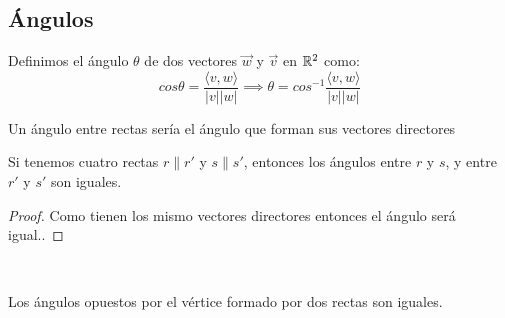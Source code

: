 \subsection{Ángulos}

\begin{ndef}
  Definimos el ángulo $\theta$ de dos vectores $\vec{w}$ y $\vec{v}$ en $\mathbb{R}^2$ como:
  \[
    cos \theta =  \frac{\langle  v,w \rangle }{|v||w|} \implies \theta = cos^{-1} \frac{\langle  v,w \rangle }{|v||w|}
  \]
\end{ndef}
\begin{nota}
  Un ángulo entre rectas sería el ángulo que forman sus vectores directores
\end{nota}

\begin{nprop}
  Si tenemos cuatro rectas $r \parallel r'$ y $s \parallel s'$, entonces los ángulos entre $r$ y $s$, y entre $r'$ y $s'$ son iguales.
\end{nprop}

\begin{proof}
	Como tienen los mismo vectores directores entonces el ángulo será igual..
\end{proof}

\begin{nprop}\hfill\\
  \begin{minipage}[c]{0.65\textwidth}
    Los ángulos opuestos por el vértice formado por dos rectas son iguales.
  \end{minipage}\hfill
  \begin{minipage}{0.30\textwidth}

  \end{minipage}
\end{nprop}

